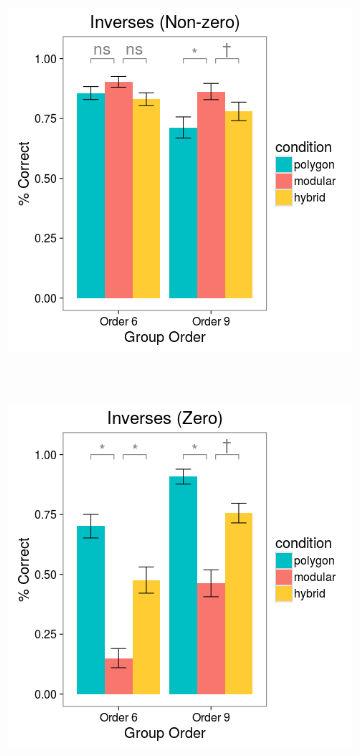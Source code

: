 \documentclass[man,10pt]{apa6}
\begin{document}
\begin{figure}[H]
\centering
\begin{subfigure}[c]{0.3\textwidth}
\centering
\includegraphics[width=\textwidth]{figures/3/in_NZ_r.png}
\end{subfigure}
~
\begin{subfigure}[c]{0.3\textwidth}
\centering
\includegraphics[width=\textwidth]{figures/3/in_Z_r.png}

\end{subfigure}
\end{figure}
\end{document}
